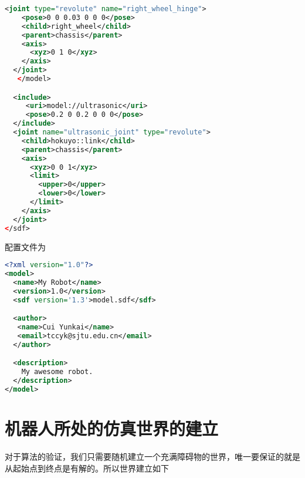 \begin{lstlisting}[language={XML}, caption={机器人模型描述文件}]
  <joint type="revolute" name="right_wheel_hinge">
    <pose>0 0 0.03 0 0 0</pose>
    <child>right_wheel</child>
    <parent>chassis</parent>
    <axis>
      <xyz>0 1 0</xyz>
    </axis>
  </joint>
   </model>

  <include>
     <uri>model://ultrasonic</uri>
     <pose>0.2 0 0.2 0 0 0</pose>
  </include>
  <joint name="ultrasonic_joint" type="revolute">
    <child>hokuyo::link</child>
    <parent>chassis</parent>
    <axis>
      <xyz>0 0 1</xyz>
      <limit>
        <upper>0</upper>
        <lower>0</lower>
      </limit>
    </axis>
  </joint>  
</sdf>
\end{lstlisting}
配置文件为 \\
\begin{lstlisting}[language={XML}, caption={机器人模型配置文件}]
<?xml version="1.0"?>
<model>
  <name>My Robot</name>
  <version>1.0</version>
  <sdf version='1.3'>model.sdf</sdf>

  <author>
   <name>Cui Yunkai</name>
   <email>tccyk@sjtu.edu.cn</email>
  </author>

  <description>
    My awesome robot.
  </description>
</model>
\end{lstlisting}
\section{机器人所处的仿真世界的建立}
对于算法的验证，我们只需要随机建立一个充满障碍物的世界，唯一要保证的就是从起始点到终点是有解的。所以世界建立如下\\

